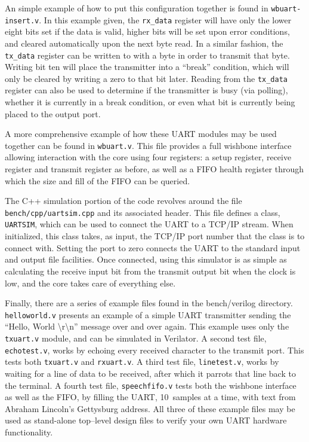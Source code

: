 \documentclass{gqtekspec}
\begin{document}
An simple example of how to put this configuration together is found in
{\tt wbuart-insert.v}.  In this example given, the {\tt rx\_data} register
will have only the lower eight bits set if the data is valid, higher bits will
be set upon error conditions, and cleared automatically upon the next byte read.
In a similar fashion, the {\tt tx\_data} register can be written to with a byte
in order to transmit that byte.  Writing bit ten will place the transmitter
into a ``break'' condition, which will only be cleared by writing a zero to
that bit later.
Reading from the {\tt tx\_data} register can also be used to determine if the
transmitter is busy (via polling), whether it is currently in a break condition,
or even what bit is currently being placed to the output port.

A more comprehensive example of how these UART modules may be used together
can be found in {\tt wbuart.v}.  This file provides a full wishbone interface
allowing interaction with the core using four registers: a setup register,
receive register and transmit register as before, as well as a FIFO health
register through which the size and fill of the FIFO can be queried.

The C++ simulation portion of the code revolves around the file
{\tt bench/cpp/uartsim.cpp} and its associated header.  This file defines a
class, {\tt UARTSIM}, which can be used to connect the UART to a TCP/IP stream.
When initialized, this class takes, as input, the TCP/IP port number that the
class is to connect with.  Setting the port to zero connects the UART to
the standard input and output file facilities.  Once connected, using this
simulator is as simple as calculating the receive input bit from the transmit
output bit when the clock is low, and the core takes care of everything else.

Finally, there are a series of example files found in the bench/verilog
directory.  {\tt helloworld.v} presents an example of a simple UART transmitter
sending the ``Hello, World {\textbackslash}r{\textbackslash}n'' message over
and over again.  This example
uses only the {\tt txuart.v} module, and can be simulated in Verilator.
A second test file, {\tt echotest.v}, works by echoing every received character
to the transmit port.
This tests both {\tt txuart.v} and {\tt rxuart.v}.
A third test file, {\tt linetest.v}, works by waiting for a line of data to be
received, after which it parrots that line back to the terminal.
A fourth test file, {\tt speechfifo.v} tests both the wishbone interface as
well as the FIFO, by filling the UART, 10~samples at a time, with text from
Abraham Lincoln's Gettysburg address.
All three of these example files may be used as stand-alone top--level design
files to verify your own UART hardware functionality.
\end{document}
